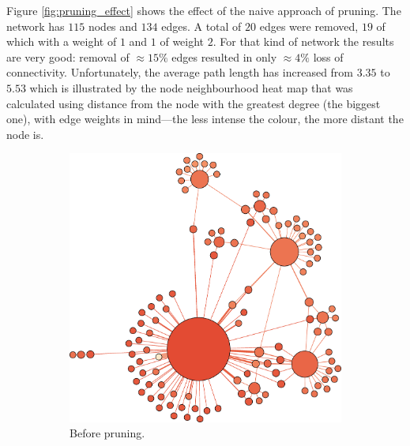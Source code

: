     Figure \ref{fig:pruning_effect} shows the effect of the naive approach of pruning. The network has $115$ nodes and $134$ edges. A total of $20$ edges were removed, $19$ of which with a weight of $1$ and $1$ of weight $2$. For that kind of network the results are very good: removal of $\approx 15\%$ edges resulted in only $\approx 4\%$ loss of connectivity. Unfortunately, the average path length has increased from $3.35$ to $5.53$ which is illustrated by the node neighbourhood heat map that was calculated using distance from the node with the greatest degree (the biggest one), with edge weights in mind---the less intense the colour, the more distant the node is.
    \begin{figure}[H]
      \centering        
        \begin{subfigure}[b]{0.50\textwidth}
          \includegraphics[width=\textwidth]{chapters/03_implementation/prune_1}
          \caption{Before pruning.}
          \label{fig:prune_1}
        \end{subfigure}
        \qquad
        \begin{subfigure}[b]{0.43\textwidth}

\end{subfigure}
\end{figure}
